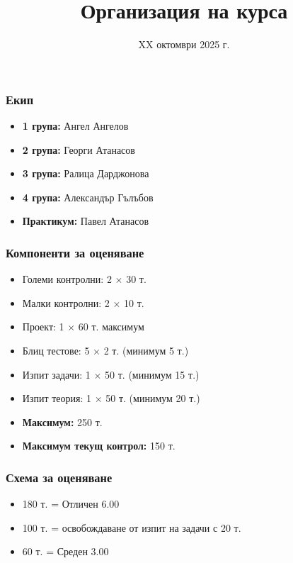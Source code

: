 \documentclass[alsotrans,beameroptions={aspectratio=169}]{beamerswitch}
\title{Организация на курса}
\date{XX октомври 2025 г.}
\begin{document}
\begin{frame}
  \titlepage
\end{frame}

\begin{frame}
  \frametitle{Екип}

  \begin{itemize}
  \item \textbf{1 група:} Ангел Ангелов
  \item \textbf{2 група:} Георги Атанасов
  \item \textbf{3 група:} Ралица Дарджонова
  \item \textbf{4 група:} Александър Гълъбов
  \item \textbf{Практикум:} Павел Атанасов
  \end{itemize}
\end{frame}

\begin{frame}
  \frametitle{Компоненти за оценяване}

  \begin{itemize}
  \item Големи контролни: 2 $\times$ 30 т.
  \item Малки контролни: 2 $\times$ 10 т.
  \item Проект: 1 $\times$ 60 т. максимум
  \item Блиц тестове: 5 $\times$ 2 т. \alert{(минимум 5 т.)}
  \item Изпит задачи: 1 $\times$ 50 т. \alert{(минимум 15 т.)}
  \item Изпит теория: 1 $\times$ 50 т. \alert{(минимум 20 т.)}
  \item \textbf{Максимум:} 250 т.
  \item \textbf{Максимум текущ контрол:} 150 т.
  \end{itemize}
\end{frame}

\begin{frame}
  \frametitle{Схема за оценяване}

  \begin{itemize}
  \item 180 т. = Отличен 6.00
  \item 100 т. = освобождаване от изпит на задачи с 20 т.
  \item 60 т. = Среден 3.00
  \end{itemize}
\end{frame}
\end{document}
